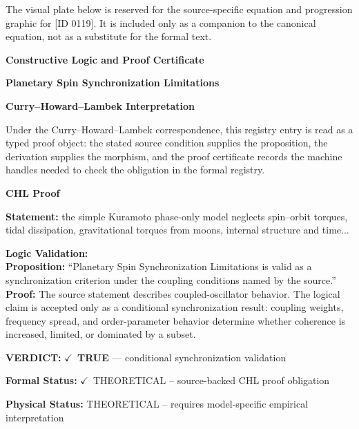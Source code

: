 \begingroup\footnotesize\sloppy
The visual plate below is reserved for the source-specific equation and progression graphic for [ID 0119]. It is included only as a companion to the canonical equation, not as a substitute for the formal text.
\par\endgroup
\ifTZPDarkEdition
{}
\fi

\clearpage
\begingroup\tzpsupportsetup
\noindent\textbf{\fontsize{10.8pt}{12.8pt}\selectfont [ID 0119] Constructive Logic and Proof Certificate}\par
\noindent\textbf{\fontsize{10pt}{12pt}\selectfont Planetary Spin Synchronization Limitations}\par
\vspace{0.45em}
\begingroup
\footnotesize
\setlength{\parskip}{0.22em}
\setlength{\parindent}{0pt}
\noindent\textbf{Curry--Howard--Lambek Interpretation}\par
Under the Curry--Howard--Lambek correspondence, this registry entry is read as a typed proof
object: the stated source condition supplies the proposition, the derivation supplies the
morphism, and the proof certificate records the machine handles needed to check the obligation
in the formal registry.

\vspace{0.45em}
\noindent\textbf{CHL Proof}\par
\textbf{Statement:} the simple Kuramoto phase-only model neglects spin--orbit torques, tidal dissipation,
gravitational torques from moons, internal structure and time...

\textbf{Logic Validation:}\\
\textbf{Proposition:} ``Planetary Spin Synchronization Limitations is valid as a synchronization criterion under
the coupling conditions named by the source.''\\
\textbf{Proof:} The source statement describes coupled-oscillator behavior. The logical claim is
accepted only as a conditional synchronization result: coupling weights, frequency
spread, and order-parameter behavior determine whether coherence is increased, limited,
or dominated by a subset.

\textbf{VERDICT:} \ensuremath{\checkmark}\ \textbf{TRUE} --- conditional synchronization validation

\textbf{Formal Status:} \ensuremath{\checkmark}\ THEORETICAL -- source-backed CHL proof obligation

\textbf{Physical Status:} THEORETICAL -- requires model-specific empirical interpretation
\par\vspace{0.45em}
\par
\ifTZPDarkEdition
{}
\fi
\endgroup
\endgroup
